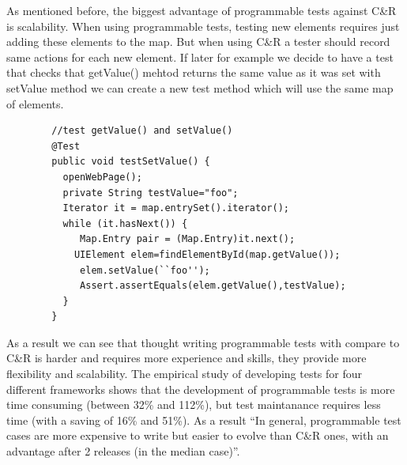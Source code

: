 \documentclass{article}
\begin{document}
      As mentioned before, the biggest advantage of programmable tests against
      C\&R is scalability. When using programmable tests, testing new elements
      requires just adding these elements to the map. But when using C\&R a
      tester should record same actions for each new element. If later for
      example we decide to have a test that checks that getValue() mehtod
      returns the same value as it was set with setValue method we can create
      a new test method which will use the same map of elements. 
      \begin{lstlisting}
        //test getValue() and setValue()
        @Test
        public void testSetValue() {
          openWebPage();
          private String testValue="foo";
          Iterator it = map.entrySet().iterator();
          while (it.hasNext()) {
             Map.Entry pair = (Map.Entry)it.next();
            UIElement elem=findElementById(map.getValue());
             elem.setValue(``foo'');  
             Assert.assertEquals(elem.getValue(),testValue);        
          }
        }
      \end{lstlisting}

      As a result we can see that thought writing programmable tests with
      compare to C\&R is harder and requires more experience and skills, they
      provide more flexibility and scalability. The empirical study
       of developing tests for four different frameworks shows that the development of programmable tests is more time
      consuming (between 32\% and 112\%), but test maintanance requires less
      time (with a saving of 16\% and 51\%). As a result ``In general, programmable test cases are more
expensive to write but easier to evolve than C\&R ones, with an advantage after
2 releases (in the median case)''.\cite{CaptureReplay7}

\end{document}
